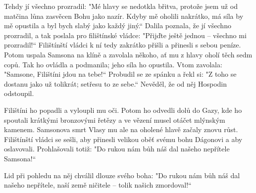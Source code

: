 \documentclass{article}
\begin{document}
Tehdy jí všechno prozradil: "Mé hlavy se nedotkla břitva, protože jsem už od matčina lůna zasvěcen Bohu jako nazír. Kdyby mě oholili nakrátko, má síla by mě opustila a byl bych slabý jako každý jiný.“
Dalila poznala, že jí všechno prozradil, a tak poslala pro filištínské vládce: "Přijďte ještě jednou – všechno mi prozradil!“ Filištínští vládci k ní tedy zakrátko přišli a přinesli s sebou peníze. Potom uspala Samsona na klíně a zavolala někoho, ať mu z hlavy oholí těch sedm copů. Tak ho ovládla a podmanila; jeho síla ho opustila.
Vtom zavolala: "Samsone, Filištíni jdou na tebe!“
Probudil se ze spánku a řekl si: "Z toho se dostanu jako už tolikrát; setřesu to ze sebe.“ Nevěděl, že od něj Hospodin odstoupil.
\medskip
\par Filištíni ho popadli a vyloupli mu oči. Potom ho odvedli dolů do Gazy, kde ho spoutali krátkými bronzovými řetězy a ve vězení musel otáčet mlýnským kamenem.
Samsonova smrt
Vlasy mu ale na oholené hlavě začaly znovu růst.
Filištínští vládci se sešli, aby přinesli velikou oběť svému bohu Dágonovi a aby oslavovali. Prohlašovali totiž:
"Do rukou nám bůh náš dal
našeho nepřítele Samsona!“

Lid při pohledu na něj chválil dlouze svého boha:
"Do rukou nám bůh náš dal
našeho nepřítele,
naší země ničitele –
tolik našich zmordoval!“
\end{document}
